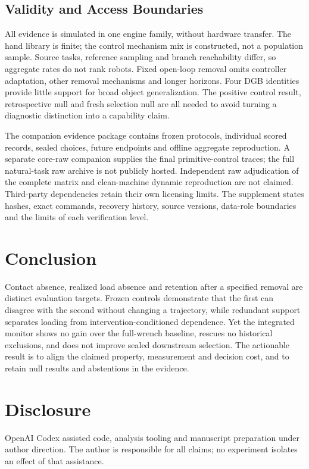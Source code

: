 \documentclass[conference,10pt,letterpaper]{IEEEtran}
\begin{document}
\subsection{Validity and Access Boundaries}
All evidence is simulated in one engine family, without hardware transfer.
The hand library is finite; the control mechanism mix is constructed, not a
population sample. Source tasks, reference sampling and branch reachability
differ, so aggregate rates do not rank robots. Fixed open-loop removal omits
controller adaptation, other removal mechanisms and longer horizons. Four
DGB identities provide little support for broad object generalization.
The positive control result, retrospective null and fresh selection null are
all needed to avoid turning a diagnostic distinction into a capability claim.

The companion evidence package contains frozen protocols, individual scored
records, sealed choices, future endpoints and offline aggregate reproduction.
A separate core-raw companion supplies the final primitive-control traces;
the full natural-task raw archive is not publicly hosted. Independent raw
adjudication of the complete matrix and clean-machine dynamic reproduction
are not claimed. Third-party dependencies retain their own licensing limits.
The supplement states hashes, exact commands, recovery history, source
versions, data-role boundaries and the limits of each verification level.

\section{Conclusion}
Contact absence, realized load absence and retention after a specified removal
are distinct evaluation targets. Frozen controls demonstrate that the first
can disagree with the second without changing a trajectory, while redundant
support separates loading from intervention-conditioned dependence. Yet the
integrated monitor shows no gain over the full-wrench baseline, rescues no
historical exclusions, and does not improve sealed downstream selection.
The actionable result is to align the claimed property, measurement and
decision cost, and to retain null results and abstentions in the evidence.

\section*{Disclosure}
OpenAI Codex assisted code, analysis tooling and manuscript preparation under
author direction. The author is responsible for all claims; no experiment
isolates an effect of that assistance.


\end{document}
